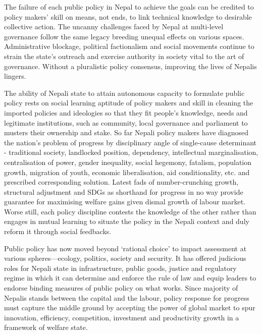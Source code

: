 \documentclass[
  openany]{book}
\begin{document}
The failure of each public policy in Nepal to achieve the goals can be credited to policy makers' skill on means, not ends, to link technical knowledge to desirable collective action. The uncanny challenges faced by Nepal at multi-level governance follow the same legacy breeding unequal effects on various spaces. Administrative blockage, political factionalism and social movements continue to strain the state's outreach and exercise authority in society vital to the art of governance. Without a pluralistic policy consensus, improving the lives of Nepalis lingers.

The ability of Nepali state to attain autonomous capacity to formulate public policy rests on social learning aptitude of policy makers and skill in cleaning the imported policies and ideologies so that they fit people's knowledge, needs and legitimate institutions, such as community, local governance and parliament to musters their ownership and stake. So far Nepali policy makers have diagnosed the nation's problem of progress by disciplinary angle of single-cause determinant - traditional society, landlocked position, dependency, intellectual marginalisation, centralisation of power, gender inequality, social hegemony, fatalism, population growth, migration of youth, economic liberalisation, aid conditionality, etc. and prescribed corresponding solution. Latest fads of number-crunching growth, structural adjustment and SDGs as shorthand for progress in no way provide guarantee for maximising welfare gains given dismal growth of labour market. Worse still, each policy discipline contests the knowledge of the other rather than engages in mutual learning to situate the policy in the Nepali context and duly reform it through social feedbacks.

Public policy has now moved beyond `rational choice' to impact assessment at various spheres---ecology, politics, society and security. It has offered judicious roles for Nepali state in infrastructure, public goods, justice and regulatory regime in which it can determine and enforce the rule of law and equip leaders to endorse binding measures of public policy on what works. Since majority of Nepalis stands between the capital and the labour, policy response for progress must capture the middle ground by accepting the power of global market to spur innovation, efficiency, competition, investment and productivity growth in a framework of welfare state.
\end{document}
